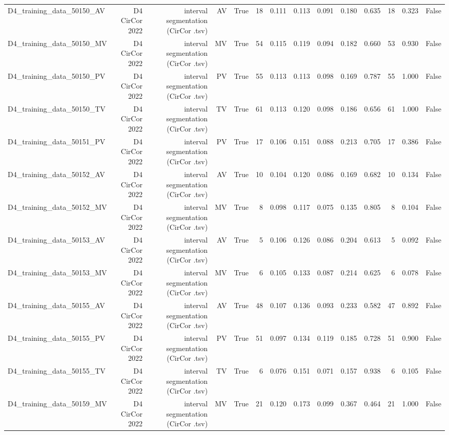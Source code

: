 \begin{table}[htbp]
\begin{tabular}{lrrrrrrrrrrrrr}
    D4\_training\_data\_50150\_AV & D4 CirCor 2022 & interval segmentation (CirCor .tsv) & AV & True & 18 & 0.111 & 0.113 & 0.091 & 0.180 & 0.635 & 18 & 0.323 & False \\
    D4\_training\_data\_50150\_MV & D4 CirCor 2022 & interval segmentation (CirCor .tsv) & MV & True & 54 & 0.115 & 0.119 & 0.094 & 0.182 & 0.660 & 53 & 0.930 & False \\
    D4\_training\_data\_50150\_PV & D4 CirCor 2022 & interval segmentation (CirCor .tsv) & PV & True & 55 & 0.113 & 0.113 & 0.098 & 0.169 & 0.787 & 55 & 1.000 & False \\
    D4\_training\_data\_50150\_TV & D4 CirCor 2022 & interval segmentation (CirCor .tsv) & TV & True & 61 & 0.113 & 0.120 & 0.098 & 0.186 & 0.656 & 61 & 1.000 & False \\
    D4\_training\_data\_50151\_PV & D4 CirCor 2022 & interval segmentation (CirCor .tsv) & PV & True & 17 & 0.106 & 0.151 & 0.088 & 0.213 & 0.705 & 17 & 0.386 & False \\
    D4\_training\_data\_50152\_AV & D4 CirCor 2022 & interval segmentation (CirCor .tsv) & AV & True & 10 & 0.104 & 0.120 & 0.086 & 0.169 & 0.682 & 10 & 0.134 & False \\
    D4\_training\_data\_50152\_MV & D4 CirCor 2022 & interval segmentation (CirCor .tsv) & MV & True & 8 & 0.098 & 0.117 & 0.075 & 0.135 & 0.805 & 8 & 0.104 & False \\
    D4\_training\_data\_50153\_AV & D4 CirCor 2022 & interval segmentation (CirCor .tsv) & AV & True & 5 & 0.106 & 0.126 & 0.086 & 0.204 & 0.613 & 5 & 0.092 & False \\
    D4\_training\_data\_50153\_MV & D4 CirCor 2022 & interval segmentation (CirCor .tsv) & MV & True & 6 & 0.105 & 0.133 & 0.087 & 0.214 & 0.625 & 6 & 0.078 & False \\
    D4\_training\_data\_50155\_AV & D4 CirCor 2022 & interval segmentation (CirCor .tsv) & AV & True & 48 & 0.107 & 0.136 & 0.093 & 0.233 & 0.582 & 47 & 0.892 & False \\
    D4\_training\_data\_50155\_PV & D4 CirCor 2022 & interval segmentation (CirCor .tsv) & PV & True & 51 & 0.097 & 0.134 & 0.119 & 0.185 & 0.728 & 51 & 0.900 & False \\
    D4\_training\_data\_50155\_TV & D4 CirCor 2022 & interval segmentation (CirCor .tsv) & TV & True & 6 & 0.076 & 0.151 & 0.071 & 0.157 & 0.938 & 6 & 0.105 & False \\
    D4\_training\_data\_50159\_MV & D4 CirCor 2022 & interval segmentation (CirCor .tsv) & MV & True & 21 & 0.120 & 0.173 & 0.099 & 0.367 & 0.464 & 21 & 1.000 & False \\

\end{tabular}
\end{table}
